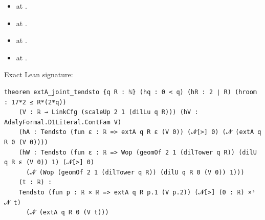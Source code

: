 \begin{theorem}[bp-087]
\begin{itemize}
\item \texttt{} at \texttt{}.
\item \texttt{} at \texttt{}.
\item \texttt{} at \texttt{}.
\item \texttt{} at \texttt{}.
\end{itemize}
\par Exact Lean signature:
\begin{verbatim}
theorem extA_joint_tendsto {q R : ℕ} (hq : 0 < q) (hR : 2 ∣ R) (hroom : 17*2 ≤ R*(2*q))
    (V : ℝ → LinkCfg (scaleUp 2 1 (dilLu q R))) (hV : AdalyFormal.D1Literal.ContFam V)
    (hA : Tendsto (fun ε : ℝ => extA q R ε (V 0)) (𝓝[>] 0) (𝓝 (extA q R 0 (V 0))))
    (hW : Tendsto (fun ε : ℝ => Wop (geomOf 2 1 (dilTower q R)) (dilU q R ε (V 0)) 1) (𝓝[>] 0)
      (𝓝 (Wop (geomOf 2 1 (dilTower q R)) (dilU q R 0 (V 0)) 1)))
    (t : ℝ) :
    Tendsto (fun p : ℝ × ℝ => extA q R p.1 (V p.2)) (𝓝[>] (0 : ℝ) ×ˢ 𝓝 t)
      (𝓝 (extA q R 0 (V t)))
\end{verbatim}
\end{theorem}

